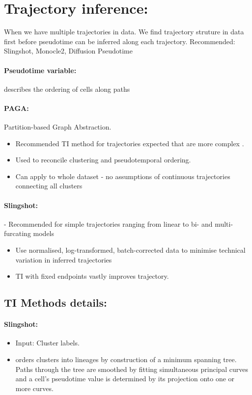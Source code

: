 \documentclass[a4paper,12pt]{article}
\begin{document}
\section{Trajectory inference:} When we have multiple trajectories in data. We find trajectory struture in data first before pseudotime can be inferred along each trajectory. Recommended: Slingshot, Monocle2, Diffusion Pseudotime
\paragraph{Pseudotime variable:} describes the ordering of cells along paths
\paragraph{PAGA:} Partition-based Graph Abstraction.
\begin{itemize}
\item Recommended TI method for trajectories expected that are more complex .
\item Used to reconcile clustering and pseudotemporal ordering.
\item Can apply to whole dataset - no assumptions of continuous trajectories connecting all clusters \end{itemize}
\paragraph{Slingshot:} - Recommended for simple trajectories ranging from linear to bi- and multi-furcating models
\begin{itemize}
\item Use normalised, log-transformed, batch-corrected data to minimise technical variation in inferred trajectories
\item TI with fixed endpoints vastly improves trajectory. \end{itemize}


\subsection{TI Methods details:}
\paragraph{Slingshot:}
\begin{itemize} \item Input: Cluster labels. \item orders clusters into lineages by construction of a minimum spanning tree. Paths through the tree are smoothed by fitting simultaneous principal curves and a cell's pseudotime value is determined by its projection onto one or more curves.
\end{itemize}
\end{document}
